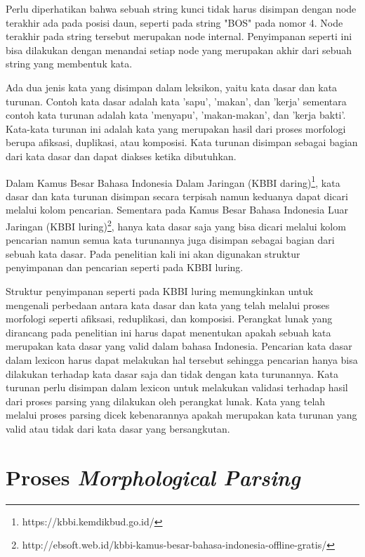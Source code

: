 Perlu diperhatikan bahwa sebuah string kunci tidak harus disimpan dengan node terakhir ada pada posisi daun, seperti pada string "BOS" pada nomor 4. Node terakhir pada string tersebut merupakan node internal. Penyimpanan seperti ini bisa dilakukan dengan menandai setiap node yang merupakan akhir dari sebuah string yang membentuk kata.

Ada dua jenis kata yang disimpan dalam leksikon, yaitu kata dasar dan kata turunan. Contoh kata dasar adalah kata 'sapu', 'makan', dan 'kerja' sementara contoh kata turunan adalah kata 'menyapu', 'makan-makan', dan 'kerja bakti'. Kata-kata turunan ini adalah kata yang merupakan hasil dari proses morfologi berupa afiksasi, duplikasi, atau komposisi. Kata turunan disimpan sebagai bagian dari kata dasar dan dapat diakses ketika dibutuhkan. 

Dalam Kamus Besar Bahasa Indonesia Dalam Jaringan (KBBI daring)\footnote{https://kbbi.kemdikbud.go.id/}, kata dasar dan kata turunan disimpan secara terpisah namun keduanya dapat dicari melalui kolom pencarian. Sementara pada Kamus Besar Bahasa Indonesia Luar Jaringan (KBBI luring)\footnote{http://ebsoft.web.id/kbbi-kamus-besar-bahasa-indonesia-offline-gratis/}, hanya kata dasar saja yang bisa dicari melalui kolom pencarian namun semua kata turunannya juga disimpan sebagai bagian dari sebuah kata dasar. Pada penelitian kali ini akan digunakan struktur penyimpanan dan pencarian seperti pada KBBI luring.

Struktur penyimpanan seperti pada KBBI luring memungkinkan untuk mengenali perbedaan antara kata dasar dan kata yang telah melalui proses morfologi seperti afiksasi, reduplikasi, dan komposisi. Perangkat lunak yang dirancang pada penelitian ini harus dapat menentukan apakah sebuah kata merupakan kata dasar yang valid dalam bahasa Indonesia. Pencarian kata dasar dalam lexicon harus dapat melakukan hal tersebut sehingga pencarian hanya bisa dilakukan terhadap kata dasar saja dan tidak dengan kata turunannya. Kata turunan perlu disimpan dalam lexicon untuk melakukan validasi terhadap hasil dari proses parsing yang dilakukan oleh perangkat lunak. Kata yang telah melalui proses parsing dicek kebenarannya apakah merupakan kata turunan yang valid atau tidak dari kata dasar yang bersangkutan.


\section{Proses \textit{Morphological Parsing}}
\label{sec:morphologicalParsing}

